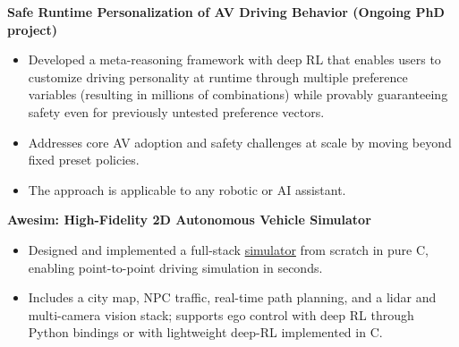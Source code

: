 \documentclass[letterpaper,11pt]{article}
\begin{document}
\textbf{Safe Runtime Personalization of AV Driving Behavior (Ongoing PhD project)}
\vspace{-1em}
\begin{itemize}
    \setlength\itemsep{0em}
  \item Developed a meta-reasoning framework with deep RL that enables users to customize driving personality at runtime through multiple preference variables (resulting in millions of combinations) while provably guaranteeing safety even for previously untested preference vectors.
  \item Addresses core AV adoption and safety challenges at scale by moving beyond fixed preset policies.
  \item The approach is applicable to any robotic or AI assistant.
\end{itemize}
\vspace{-0.5em}
\textbf{Awesim: High-Fidelity 2D Autonomous Vehicle Simulator}
\vspace{-1em}
\begin{itemize}
\setlength\itemsep{0em}
  \item Designed and implemented a full-stack \href{https://github.com/bhatiaabhinav/Awesim}{simulator} from scratch in pure C, enabling point-to-point driving simulation in seconds.
  \item Includes a city map, NPC traffic, real-time path planning, and a lidar and multi-camera vision stack; supports ego control with deep RL through Python bindings or with lightweight deep-RL implemented in C.
\end{itemize}
\end{document}
